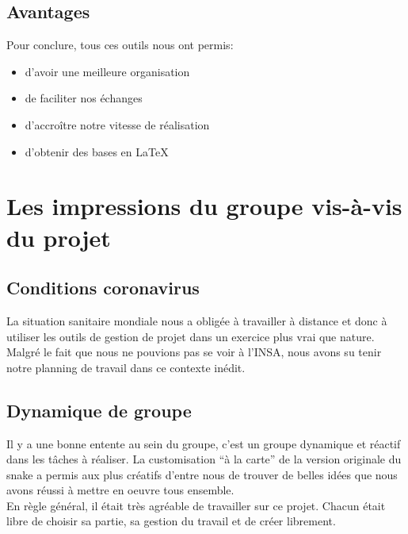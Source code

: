 \documentclass[11pt,a4paper]{article}
\begin{document}
        \subsection{Avantages}
        
        Pour conclure, tous ces outils nous ont permis:
        
        \begin{itemize}
        \item d'avoir une meilleure organisation 
        \item de faciliter nos échanges 
        \item d'accroître notre vitesse de réalisation
        \item d'obtenir des bases en \LaTeX{}
        \end{itemize}
        
        \section{Les impressions du groupe vis-à-vis du projet}
        
        \subsection{Conditions coronavirus}
        La situation sanitaire mondiale nous a obligée à travailler à distance et donc à utiliser les outils de gestion de projet dans un exercice plus vrai que nature. Malgré le fait que nous ne pouvions pas se voir à l'INSA, nous avons su tenir notre planning de travail dans ce contexte inédit.
        
        \subsection{Dynamique de groupe}
        Il y a une bonne entente au sein du groupe, c'est un groupe dynamique et réactif dans les tâches à réaliser. La customisation ``à la carte'' de la version originale du snake a permis aux plus créatifs d'entre nous de trouver de belles idées que nous avons réussi à mettre en oeuvre tous ensemble. \\ 
        En règle général, il était très agréable de travailler sur ce projet. Chacun était libre de choisir sa partie, sa gestion du travail et de créer librement.  
        
\end{document}
